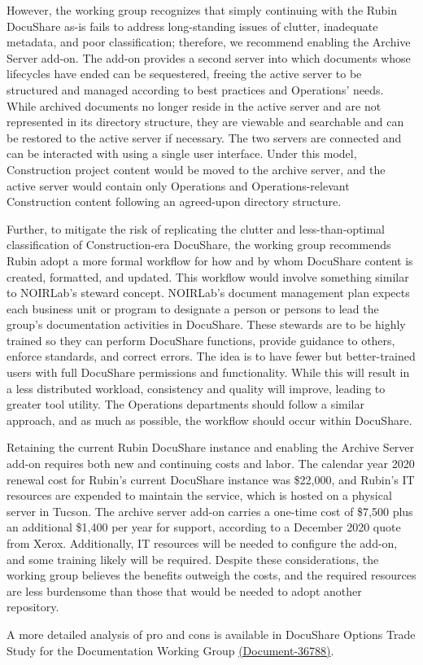 However, the working group recognizes that simply continuing with the Rubin DocuShare as-is fails to address long-standing issues of clutter, inadequate 
metadata, and poor classification; therefore, we recommend enabling the Archive Server add-on. The add-on provides a second server into which documents 
whose lifecycles have ended can be sequestered, freeing the active server to be structured and managed according to best practices and Operations’ needs. 
While archived documents no longer reside in the active server and are not represented in its directory structure, they are viewable and searchable and can be 
restored to the active server if necessary. The two servers are connected and can be interacted with using a single user interface. Under this model, 
Construction project content would be moved to the archive server, and the active server would contain only Operations and Operations-relevant Construction 
content following an agreed-upon directory structure.

Further, to mitigate the risk of replicating the clutter and less-than-optimal classification of Construction-era DocuShare, the working group recommends Rubin 
adopt a more formal workflow for how and by whom DocuShare content is created, formatted, and updated. This workflow would involve something similar to 
NOIRLab’s steward concept. NOIRLab’s document management plan expects each business unit or program to designate a person or persons to lead the 
group’s documentation activities in DocuShare. These stewards are to be highly trained so they can perform DocuShare functions, provide guidance to others, 
enforce standards, and correct errors. The idea is to have fewer but better-trained users with full DocuShare permissions and functionality. While this will result in 
a less distributed workload, consistency and quality will improve, leading to greater tool utility. The Operations departments should follow a similar approach, and 
as much as possible, the workflow should occur within DocuShare.

Retaining the current Rubin DocuShare instance and enabling the Archive Server add-on requires both new and continuing costs and labor. The calendar year 
2020 renewal cost for Rubin’s current DocuShare instance was \$22,000, and Rubin's IT resources are expended to maintain the service, which is hosted on a 
physical server in Tucson. The archive server add-on carries a one-time cost of \$7,500 plus an additional \$1,400 per year for support, according to a December 
2020 quote from Xerox. Additionally, IT resources will be needed to configure the add-on, and some training likely will be required. Despite these considerations, 
the working group believes the benefits outweigh the costs, and the required resources are less burdensome than those that would be needed to adopt another 
repository.

A more detailed analysis of pro and cons is available in DocuShare Options Trade Study for the Documentation Working Group \href{https://docushare.lsst.org/docushare/dsweb/Get/Document-36788/DocuShareOptionsTradeStudy.pdf}{(Document-36788)}.
